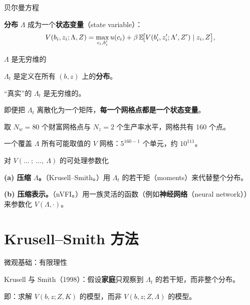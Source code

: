 \documentclass[10pt,aspectratio=169]{beamer}
\begin{document}
\begin{frame}{贝尔曼方程}

\textbf{分布} $\Lambda$ 成为一个\textbf{状态变量}（state variable）：
\[
  V(b_i, z_i; \Lambda, Z) = \max_{c_i, b_i'} u(c_i) + \beta\, \mathbb{E}\!\bigl[V(b_i', z_i'; \Lambda', Z') \mid z_i, Z\bigr],
\]

\end{frame}

\begin{frame}{$\Lambda$ 是无穷维的}

$\Lambda_t$ 是定义在所有 $(b, z)$ 上的\textbf{分布}。

\smallskip

``真实''的 $\Lambda_t$ 是无穷维的。

\smallskip

即便把 $\Lambda_t$ 离散化为一个矩阵，\textbf{每一个网格点都是一个状态变量}。

取 $N_w = 80$ 个财富网格点与 $N_z = 2$ 个生产率水平，网格共有 160 个点。

\smallskip

一个覆盖 $\Lambda$ 所有可能取值的 $V$ 网格：$5^{160-1}$ 个单元，约 $10^{111}$。

\end{frame}

\begin{frame}{对 $V(\ldots\ ;\ \ldots,\ \Lambda)$ 的可处理参数化}

\textbf{(a) 压缩 $\Lambda$。}（Krusell--Smith。）用 $\Lambda_t$ 的若干矩（moments）来代替整个分布。

\smallskip

\textbf{(b) 压缩表示。}（nVFI。）用一族灵活的函数（例如\textbf{神经网络}（neural network））来参数化 $V(\Lambda, \cdot)$。

\end{frame}

\section[K--S 方法]{Krusell--Smith 方法}

\begin{frame}{微观基础：有限理性}

Krusell 与 Smith（1998）：假设\textbf{家庭}只观察到 $\Lambda_t$ 的若干矩，而非整个分布。

\smallskip

即：求解 $V(b, z; Z, K)$ 的模型，而非 $V(b, z; Z, \Lambda)$ 的模型。

\end{frame}
\end{document}
